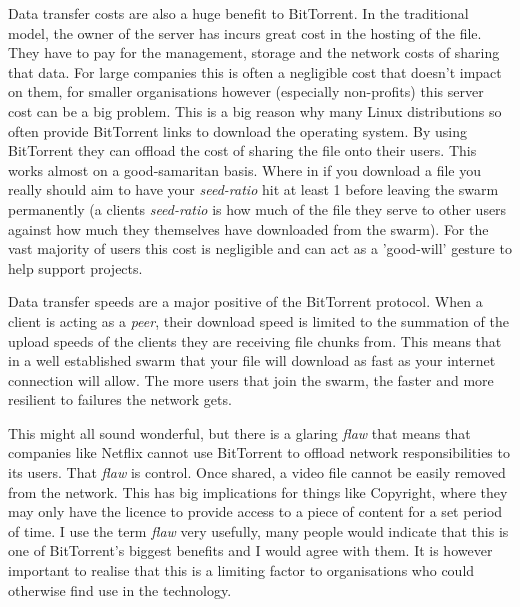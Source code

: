 Data transfer costs are also a huge benefit to BitTorrent. In the traditional model, the owner of the server has incurs great cost in the hosting of the file. They have to pay for the management, storage and the network costs of sharing that data. For large companies this is often a negligible cost that doesn't impact on them, for smaller organisations however (especially non-profits) this server cost can be a big problem. This is a big reason why many Linux distributions so often provide BitTorrent links to download the operating system. By using BitTorrent they can offload the cost of sharing the file onto their users. This works almost on a good-samaritan basis. Where in if you download a file you really should aim to have your \textit{seed-ratio} hit at least 1 before leaving the swarm permanently (a clients \textit{seed-ratio} is how much of the file they serve to other users against how much they themselves have downloaded from the swarm). For the vast majority of users this cost is negligible and can act as a 'good-will' gesture to help support projects.

Data transfer speeds are a major positive of the BitTorrent protocol. When a client is acting as a \textit{peer}, their download speed is limited to the summation of the upload speeds of the clients they are receiving file chunks from. This means that in a well established swarm that your file will download as fast as your internet connection will allow. The more users that join the swarm, the faster and more resilient to failures the network gets.

This might all sound wonderful, but there is a glaring \textit{flaw} that means that companies like Netflix cannot use BitTorrent to offload network responsibilities to its users. That \textit{flaw} is control. Once shared, a video file cannot be easily removed from the network. This has big implications for things like Copyright, where they may only have the licence to provide access to a piece of content for a set period of time. I use the term \textit{flaw} very usefully, many people would indicate that this is one of BitTorrent's biggest benefits and I would agree with them. It is however important to realise that this is a limiting factor to organisations who could otherwise find use in the technology.

